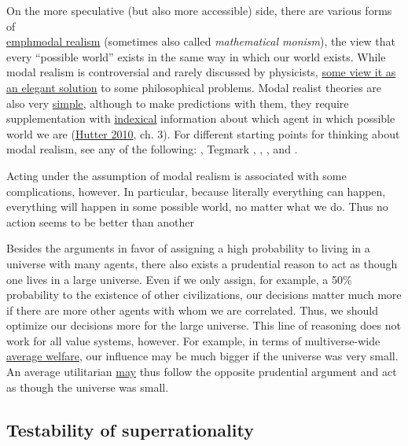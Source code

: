 On the more speculative (but also more accessible) side, there are
various forms of
\href{https://en.wikipedia.org/wiki/Modal_realism}{\\emph{modal
realism}} (sometimes also called \emph{mathematical monism}), the view
that every ``possible world'' exists in the same way in which our world
exists. While modal realism is controversial and rarely discussed by
physicists,
\href{http://reducing-suffering.org/why-does-physics-exist/\#Maybe_theres_no_such_thing_as_existence}{some
view it as an elegant solution} to some philosophical problems. Modal
realist theories are also very
\href{http://lesswrong.com/lw/jp/occams_razor/}{simple}, although
to make predictions with them, they require supplementation with
\href{https://en.wikipedia.org/wiki/Indexicality\#Extensions}{indexical}
information about which agent in which possible world we are
(\href{https://arxiv.org/abs/0912.5434}{Hutter 2010}, ch. 3). For
different starting points for thinking about modal realism, see any of
the following:
\citet{Lewis1986-rk}, Tegmark \citeyear{Tegmark1998-mf}, \citeyear{Tegmark2008-sq}, \citeyear{Tegmark2014-mw}, and
\citet{Schmidhuber1997-vd}.

Acting under the assumption of modal realism is associated with some
complications, however. In particular, because literally everything can
happen, everything will happen in some possible world, no matter what we
do. Thus no action seems to be better than another~\parencite{Oesterheld201X-2}

Besides the arguments in favor of assigning a high probability to living
in a universe with many agents, there also exists a prudential reason to
act as though one lives in a large universe. Even if we only assign, for
example, a 50\% probability to the existence of other civilizations, our
decisions matter much more if there are more other agents with whom we
are correlated. Thus, we should optimize our decisions more for the
large universe. This line of reasoning does not work for all value
systems, however. For example, in terms of multiverse-wide
\href{https://en.wikipedia.org/wiki/Average_and_total_utilitarianism}{average
welfare}, our influence may be much bigger if the universe was very
small. An average utilitarian
\href{https://casparoesterheld.com/2017/03/15/the-average-utilitarians-solipsism-wager/}{may}
thus follow the opposite prudential argument and act as though the
universe was small.

\subsection{Testability of
superrationality}\label{testability-of-superrationality}

